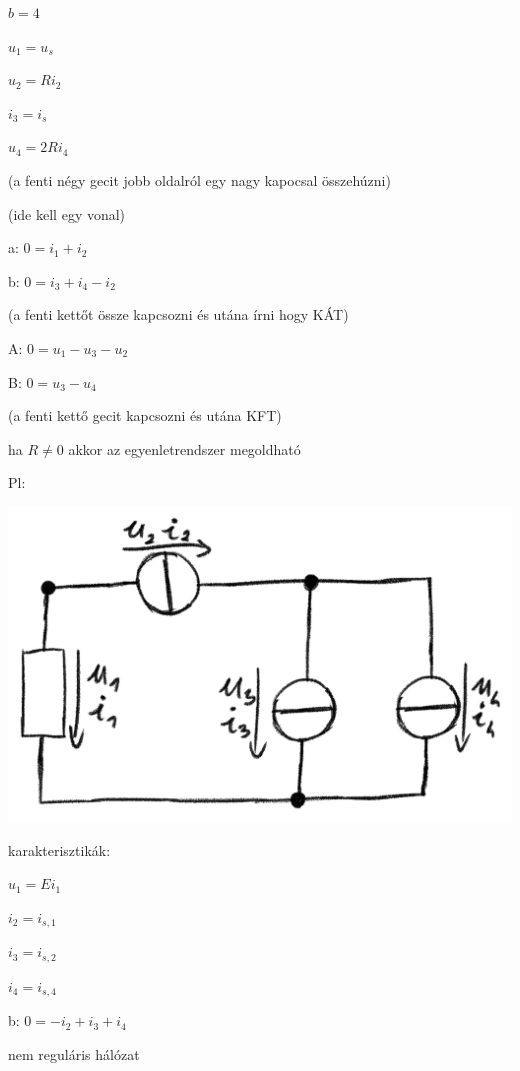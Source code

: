 \documentclass[12pt]{article}
\begin{document}
            $b = 4$

            $u_1 = u_s$

            $u_2=Ri_2$

            $i_3 = i_s$

            $u_4 = 2R i_4$

            (a fenti négy gecit jobb oldalról egy nagy kapocsal összehúzni)

            (ide kell egy vonal)

            a: $0=i_1+i_2$
            
            b: $0=i_3+i_4-i_2$

            (a fenti kettőt össze kapcsozni és utána írni hogy KÁT)

            A: $0=u_1-u_3-u_2$
            
            B: $0=u_3-u_4$ 

            (a fenti kettő gecit kapcsozni és utána KFT)

            ha $R \neq 0$ akkor az egyenletrendszer megoldható 

        Pl: 

            \includegraphics{img/11.png}

            karakterisztikák: 

            $u_1 = Ei_1$

            $i_2=i_{s,1}$
            
            $i_3= i_{s,2}$
            
            $i_4=i_{s,4}$

            b: $0=-i_2+i_3+i_4$

            \Lightning \;nem reguláris hálózat

        
\end{document}
